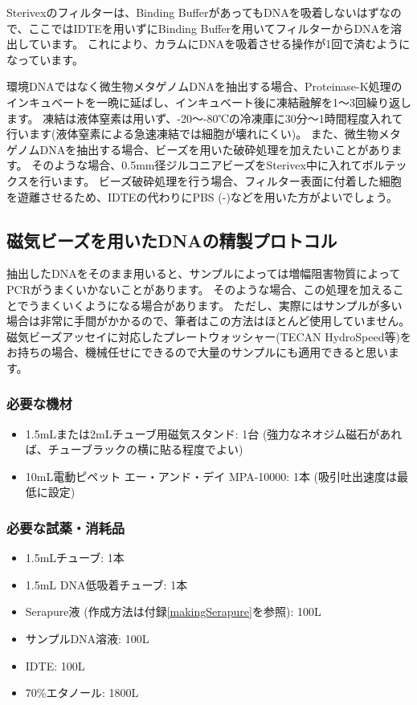 \documentclass[titlepage,10pt,a4paper,uplatex]{jsbook}
\begin{document}
Sterivexのフィルターは、Binding BufferがあってもDNAを吸着しないはずなので、ここではIDTEを用いずにBinding Bufferを用いてフィルターからDNAを溶出しています。
これにより、カラムにDNAを吸着させる操作が1回で済むようになっています。

環境DNAではなく微生物メタゲノムDNAを抽出する場合、Proteinase-K処理のインキュベートを一晩に延ばし、インキュベート後に凍結融解を1～3回繰り返します。
凍結は液体窒素は用いず、{-20}～{-80}℃の冷凍庫に30分～1時間程度入れて行います(液体窒素による急速凍結では細胞が壊れにくい)。
また、微生物メタゲノムDNAを抽出する場合、ビーズを用いた破砕処理を加えたいことがあります。
そのような場合、0.5mm径ジルコニアビーズをSterivex中に入れてボルテックスを行います\citep{Ushio2019}。
ビーズ破砕処理を行う場合、フィルター表面に付着した細胞を遊離させるため、IDTEの代わりにPBS (-)などを用いた方がよいでしょう。

\subsection{磁気ビーズを用いたDNAの精製プロトコル}\label{PCRinhibitorremoval}

抽出したDNAをそのまま用いると、サンプルによっては増幅阻害物質によってPCRがうまくいかないことがあります。
そのような場合、この処理を加えることでうまくいくようになる場合があります。
ただし、実際にはサンプルが多い場合は非常に手間がかかるので、筆者はこの方法はほとんど使用していません。
磁気ビーズアッセイに対応したプレートウォッシャー(TECAN HydroSpeed等)をお持ちの場合、機械任せにできるので大量のサンプルにも適用できると思います。

\subsubsection{必要な機材}
\begin{itemize}
\item 1.5mLまたは2mLチューブ用磁気スタンド: 1台 (強力なネオジム磁石があれば、チューブラックの横に貼る程度でよい)
\item 10mL電動ピペット エー・アンド・デイ MPA-10000: 1本 (吸引吐出速度は最低に設定)
\end{itemize}

\subsubsection{必要な試薬・消耗品}
\begin{itemize}
\item 1.5mLチューブ: 1本
\item 1.5mL DNA低吸着チューブ: 1本
\item Serapure液 (作成方法は付録\ref{makingSerapure}を参照): 100{\textmu}L
\item サンプルDNA溶液: 100{\textmu}L
\item IDTE: 100{\textmu}L
\item 70\%エタノール: 1800{\textmu}L
\end{itemize}
\end{document}
